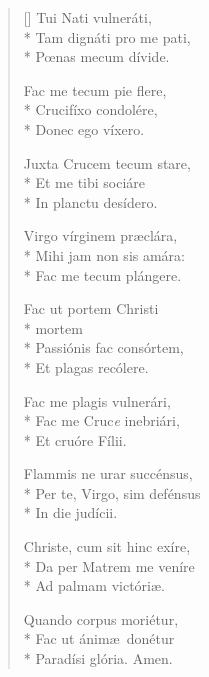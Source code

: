 \begin{multicols}{2}
\begin{verse}[\versewidth]
Tui Nati vulneráti,\\*
Tam dignáti pro me pati,\\*
P\oe nas mecum dívide.

Fac me tecum pie flere,\\*
Crucifíxo condolére,\\*
Donec ego víxero.

Juxta Crucem tecum stare,\\*
Et me tibi sociáre\\*
In planctu desídero.

Virgo vírginem pr\ae clára,\\*
Mihi jam non sis amára:\\*
Fac me tecum plángere.

Fac ut portem Christi\\*
\qquad mortem\\*
Passiónis fac consórtem,\\*
Et plagas recólere.

Fac me plagis vulnerári,\\*
Fac me Cruc\emph{e} inebriári,\\*
Et cruóre Fílii.

Flammis ne urar succénsus,\\*
Per te, Virgo, sim defénsus\\*
In die judícii.

Christe, cum sit hinc exíre,\\*
Da per Matrem me veníre\\*
Ad palmam victóri\ae .

Quando corpus moriétur,\\*
Fac ut ánim\ae\ donétur\\*
Paradísi glória.  Amen.

\end{verse}
\end{multicols}

